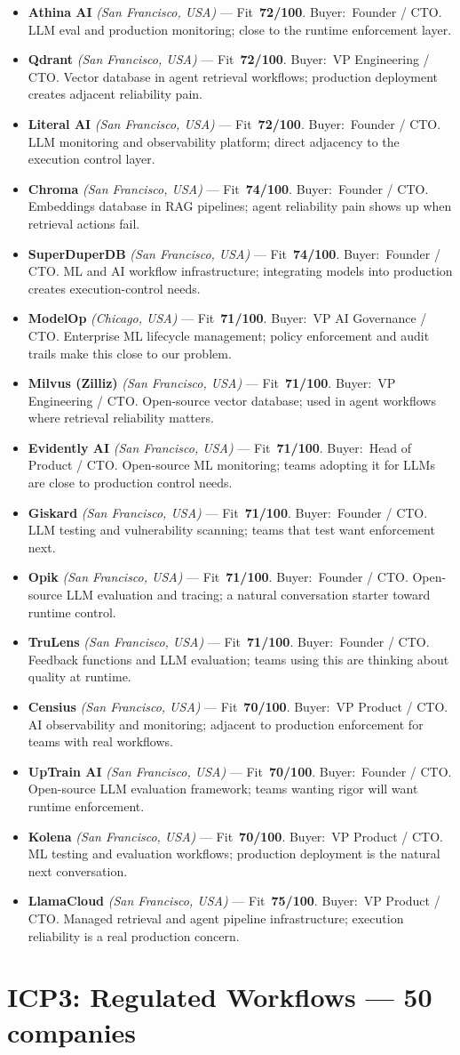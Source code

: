 \documentclass[10pt]{article}
\newcommand{\cand}[5]{\item \textbf{#1} \textit{(#2)} --- Fit~\textbf{#3/100}. Buyer:~#4. #5}
\begin{document}
\begin{itemize}
\cand{Athina AI}{San Francisco, USA}{72}{Founder / CTO}{LLM eval and production monitoring; close to the runtime enforcement layer.}
\cand{Qdrant}{San Francisco, USA}{72}{VP Engineering / CTO}{Vector database in agent retrieval workflows; production deployment creates adjacent reliability pain.}
\cand{Literal AI}{San Francisco, USA}{72}{Founder / CTO}{LLM monitoring and observability platform; direct adjacency to the execution control layer.}
\cand{Chroma}{San Francisco, USA}{74}{Founder / CTO}{Embeddings database in RAG pipelines; agent reliability pain shows up when retrieval actions fail.}
\cand{SuperDuperDB}{San Francisco, USA}{74}{Founder / CTO}{ML and AI workflow infrastructure; integrating models into production creates execution-control needs.}
\cand{ModelOp}{Chicago, USA}{71}{VP AI Governance / CTO}{Enterprise ML lifecycle management; policy enforcement and audit trails make this close to our problem.}
\cand{Milvus (Zilliz)}{San Francisco, USA}{71}{VP Engineering / CTO}{Open-source vector database; used in agent workflows where retrieval reliability matters.}
\cand{Evidently AI}{San Francisco, USA}{71}{Head of Product / CTO}{Open-source ML monitoring; teams adopting it for LLMs are close to production control needs.}
\cand{Giskard}{San Francisco, USA}{71}{Founder / CTO}{LLM testing and vulnerability scanning; teams that test want enforcement next.}
\cand{Opik}{San Francisco, USA}{71}{Founder / CTO}{Open-source LLM evaluation and tracing; a natural conversation starter toward runtime control.}
\cand{TruLens}{San Francisco, USA}{71}{Founder / CTO}{Feedback functions and LLM evaluation; teams using this are thinking about quality at runtime.}
\cand{Censius}{San Francisco, USA}{70}{VP Product / CTO}{AI observability and monitoring; adjacent to production enforcement for teams with real workflows.}
\cand{UpTrain AI}{San Francisco, USA}{70}{Founder / CTO}{Open-source LLM evaluation framework; teams wanting rigor will want runtime enforcement.}
\cand{Kolena}{San Francisco, USA}{70}{VP Product / CTO}{ML testing and evaluation workflows; production deployment is the natural next conversation.}
\cand{LlamaCloud}{San Francisco, USA}{75}{VP Product / CTO}{Managed retrieval and agent pipeline infrastructure; execution reliability is a real production concern.}
\end{itemize}
\clearpage
\section{ICP3: Regulated Workflows --- 50 companies}
\end{document}
